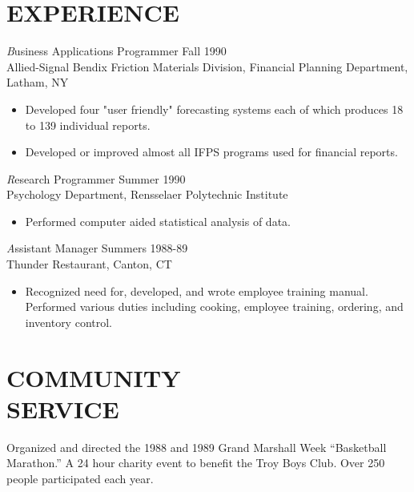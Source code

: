\documentclass[line,margin]{res}
\begin{document}
\begin{resume}
\section{EXPERIENCE} {\textit Business Applications Programmer} \hfill Fall 1990 \\
                Allied-Signal Bendix Friction Materials Division, 
                Financial Planning Department, Latham, NY
                 \begin{itemize}  \itemsep -2pt %
                 \item Developed four "user friendly" forecasting 
                    systems each of which produces 18 to 139 
                    individual reports. 
                \item   Developed or improved almost all IFPS 
                    programs used for financial reports. 
                \end{itemize}
 
                {\textit Research Programmer} \hfill            Summer 1990 \\
                Psychology Department, Rensselaer Polytechnic 
                Institute 
                 \begin{itemize}  \itemsep -2pt %
                 \item Performed computer aided statistical analysis 
                    of data. 
                 \end{itemize} 
                {\textit Assistant Manager} \hfill        Summers 1988-89 \\
                Thunder Restaurant, Canton, CT
                  \begin{itemize}
                   \item Recognized need for, developed, and wrote 
                    employee training manual. Performed various 
                    duties including cooking, employee training, 
                    ordering, and inventory control. 
                   \end{itemize} 
 
\section{COMMUNITY \\ SERVICE}  Organized and directed the 1988 and 1989 Grand 
                 Marshall Week \newline ``Basketball Marathon.'' A 24 hour 
                charity event to benefit the Troy Boys Club. Over 
                250 people participated each year. 


\end{resume}
\end{document}
